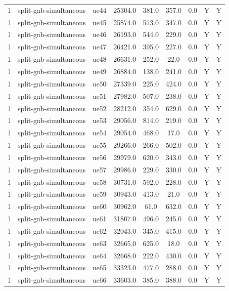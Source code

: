 \begin{table}[ht]
\begin{tabular}{|c|c|c|c|c|c|c|c|c|}
1 & split-gnb-simultaneous & ue44 & 25304.0 & 381.0 & 357.0 & 0.0 & Y & Y \\
1 & split-gnb-simultaneous & ue45 & 25874.0 & 573.0 & 347.0 & 0.0 & Y & Y \\
1 & split-gnb-simultaneous & ue46 & 26193.0 & 544.0 & 229.0 & 0.0 & Y & Y \\
1 & split-gnb-simultaneous & ue47 & 26421.0 & 395.0 & 227.0 & 0.0 & Y & Y \\
1 & split-gnb-simultaneous & ue48 & 26631.0 & 252.0 & 22.0 & 0.0 & Y & Y \\
1 & split-gnb-simultaneous & ue49 & 26884.0 & 138.0 & 241.0 & 0.0 & Y & Y \\
1 & split-gnb-simultaneous & ue50 & 27339.0 & 225.0 & 424.0 & 0.0 & Y & Y \\
1 & split-gnb-simultaneous & ue51 & 27982.0 & 507.0 & 238.0 & 0.0 & Y & Y \\
1 & split-gnb-simultaneous & ue52 & 28212.0 & 354.0 & 629.0 & 0.0 & Y & Y \\
1 & split-gnb-simultaneous & ue53 & 29056.0 & 814.0 & 219.0 & 0.0 & Y & Y \\
1 & split-gnb-simultaneous & ue54 & 29054.0 & 468.0 & 17.0 & 0.0 & Y & Y \\
1 & split-gnb-simultaneous & ue55 & 29266.0 & 266.0 & 502.0 & 0.0 & Y & Y \\
1 & split-gnb-simultaneous & ue56 & 29979.0 & 620.0 & 343.0 & 0.0 & Y & Y \\
1 & split-gnb-simultaneous & ue57 & 29986.0 & 229.0 & 330.0 & 0.0 & Y & Y \\
1 & split-gnb-simultaneous & ue58 & 30731.0 & 592.0 & 228.0 & 0.0 & Y & Y \\
1 & split-gnb-simultaneous & ue59 & 30943.0 & 413.0 & 21.0 & 0.0 & Y & Y \\
1 & split-gnb-simultaneous & ue60 & 30962.0 & 61.0 & 632.0 & 0.0 & Y & Y \\
1 & split-gnb-simultaneous & ue61 & 31807.0 & 496.0 & 245.0 & 0.0 & Y & Y \\
1 & split-gnb-simultaneous & ue62 & 32043.0 & 345.0 & 415.0 & 0.0 & Y & Y \\
1 & split-gnb-simultaneous & ue63 & 32665.0 & 625.0 & 18.0 & 0.0 & Y & Y \\
1 & split-gnb-simultaneous & ue64 & 32668.0 & 222.0 & 430.0 & 0.0 & Y & Y \\
1 & split-gnb-simultaneous & ue65 & 33323.0 & 477.0 & 288.0 & 0.0 & Y & Y \\
1 & split-gnb-simultaneous & ue66 & 33603.0 & 385.0 & 388.0 & 0.0 & Y & Y \\

\end{tabular}
\end{table}
